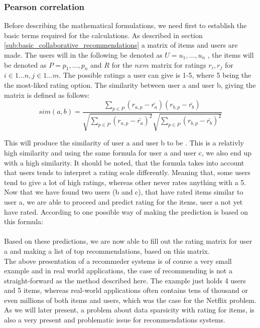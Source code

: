 \subsubsection{Pearson correlation}
Before describing the mathematical formulations, we need first to establish the basic terms required for the calculations. As described in section \ref{sub:basic_collaborative_recommendations} a matrix of items and users are made. The users will in the following be denoted as \( U = {u_{1}, ... , u_{n}} \) , the items will be denoted as \( P = {p_{1}, ..., p_{n}} \) and \(R\) for the \({n x m}\) matrix for ratings \(r_{i}, r_{j}\) for \(i \in 1 ... n, j \in 1 ... m\). The possible ratings a user can give is 1-5, where 5 being the the most-liked rating option. 
The similarity between user a and user b, giving the matrix  is defined as follows:\\

\[
	sim(a,b) = \frac{\sum_{p\in P} (r_{a,p} - \bar{r_{a}})(r_{b,p} - \bar{r_{b}})}{\sqrt{\sum_{p\in P} (r_{a,p} - \bar{r_{a}})^2} \sqrt{\sum_{p\in P} (r_{b,p} - \bar{r_{b}})^2}}
\]


This will produce the similarity of user a and user b to be . This is a relativly high similarity and using the same formula for user a and user c, we also end up with a high similarity. It should be noted, that the formula takes into account that users tends to interpret a rating scale differently. Meaning that, some users tend to give a lot of high ratings, whereas other never rates anything with a 5. 
Now that we have found two users (b and c), that have rated items similar to user a, we are able to proceed and predict rating for the items, user a not yet have rated. According to  one possible way of making the prediction is based on this formula:\\

\\

Based on these predictions, we are now able to fill out the rating matrix for user a and making a list of top recommendations, based on this matrix. \\

The above presentation of a recommeder systems is of course a very small example and in real world applications, the case of recommending is not a straight-forward as the method described here. The example just holds 4 users and 5 items, whereas real-world applications often contains tens of thousand or even millions of both items and users, which was the case for the Netflix problem. As we will later present, a problem about data sparsicity with rating for items, is also a very present and problematic issue for recommendations systems.  

